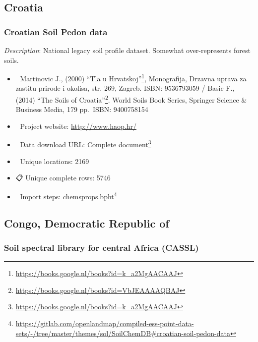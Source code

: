 \documentclass[
  graybox,natbib,nospthms]{svmono}
\providecommand{\tightlist}{%
  \setlength{\itemsep}{0pt}\setlength{\parskip}{0pt}}
\providecommand{\tightlist}{\setlength{\itemsep}{0pt}\setlength{\parskip}{0pt}}
\renewcommand{\href}[2]{#2 (\url{#1})}
\renewcommand{\href}[2]{#2\footnote{\url{#1}}}
\begin{document}
\hypertarget{croatia}{%
\subsection{Croatia}\label{croatia}}

\hypertarget{croatian-soil-pedon-data}{%
\subsubsection{Croatian Soil Pedon data}\label{croatian-soil-pedon-data}}

\emph{Description}: National legacy soil profile dataset. Somewhat over-represents forest soils.

\begin{itemize}
\tightlist
\item
  📕 Martinovic J., (2000) \href{https://books.google.nl/books?id=k_a2MgAACAAJ}{``Tla u Hrvatskoj''}, Monografija, Drzavna uprava za zastitu prirode i okolisa, str. 269, Zagreb. ISBN: 9536793059 / Basic F., (2014) \href{https://books.google.nl/books?id=VbJEAAAAQBAJ}{``The Soils of Croatia''}. World Soils Book Series, Springer Science \& Business Media, 179 pp.~ISBN: 9400758154\\
\item
  🔗 Project website: \url{http://www.haop.hr/}\\
\item
  📂 Data download URL: \href{https://books.google.nl/books?id=k_a2MgAACAAJ}{Complete document}\\
\item
  📍 Unique locations: 2169\\
\item
  📋 Unique complete rows: 5746\\
\item
  📝 Import steps: \href{https://gitlab.com/openlandmap/compiled-ess-point-data-sets/-/tree/master/themes/sol/SoilChemDB\#croatian-soil-pedon-data}{chemsprops.bpht}
\end{itemize}

\hypertarget{congo-democratic-republic-of}{%
\subsection{Congo, Democratic Republic of}\label{congo-democratic-republic-of}}

\hypertarget{soil-spectral-library-for-central-africa-cassl}{%
\subsubsection{Soil spectral library for central Africa (CASSL)}\label{soil-spectral-library-for-central-africa-cassl}}
\end{document}
